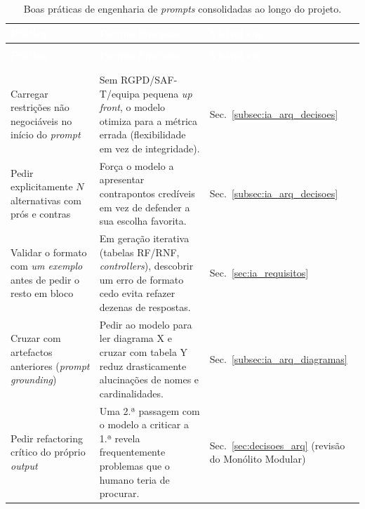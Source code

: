 \begin{center}
{\small
{}
\begin{xltabular}{\textwidth}{|>{\raggedright\arraybackslash}p{4cm}|>{\raggedright\arraybackslash}X|>{\raggedright\arraybackslash}p{2.5cm}|}
\hline
{}\textcolor{white}{\textbf{Prática}} & \textcolor{white}{\textbf{Porque funciona}} & \textcolor{white}{\textbf{Visível em}} \\ \hline
\endfirsthead

 \\
\hline
{}\textcolor{white}{\textbf{Prática}} & \textcolor{white}{\textbf{Porque funciona}} & \textcolor{white}{\textbf{Visível em}} \\ \hline
\endhead

\hline {} \\ \hline \endfoot

\hline
\caption{Boas práticas de engenharia de \textit{prompts} consolidadas ao longo do projeto.}
\label{tab:boas_praticas} \\
\endlastfoot

Carregar restrições não negociáveis no início do \textit{prompt} & Sem RGPD/SAF-T/equipa pequena \textit{up front}, o modelo otimiza para a métrica errada (flexibilidade em vez de integridade). & Sec.~\ref{subsec:ia_arq_decisoes} \\ \hline

Pedir explicitamente $N$ alternativas com prós e contras & Força o modelo a apresentar contrapontos credíveis em vez de defender a sua escolha favorita. & Sec.~\ref{subsec:ia_arq_decisoes} \\ \hline

Validar o formato com \emph{um exemplo} antes de pedir o resto em bloco & Em geração iterativa (tabelas RF/RNF, \textit{controllers}), descobrir um erro de formato cedo evita refazer dezenas de respostas. & Sec.~\ref{sec:ia_requisitos} \\ \hline

Cruzar com artefactos anteriores (\textit{prompt grounding}) & Pedir ao modelo para ler diagrama X e cruzar com tabela Y reduz drasticamente alucinações de nomes e cardinalidades. & Sec.~\ref{subsec:ia_arq_diagramas} \\ \hline

Pedir refactoring crítico do próprio \textit{output} & Uma 2.ª passagem com o modelo a criticar a 1.ª revela frequentemente problemas que o humano teria de procurar. & Sec.~\ref{sec:decisoes_arq} (revisão do Monólito Modular) \\ \hline


\end{xltabular}}
\end{center}
